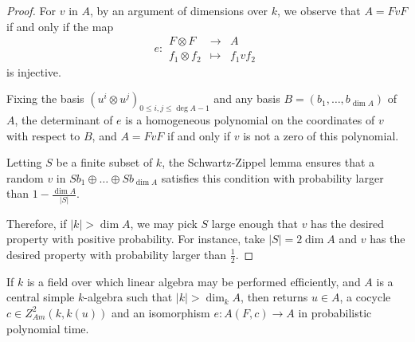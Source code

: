     \begin{proof}
        For \(v\) in \(A\), by an argument of dimensions over \(k\), we observe that \(A = FvF\) if and only if the map
        \[e\colon\begin{array}{ccl} F \otimes F &\to &A \\ f_1 \otimes f_2 &\mapsto &f_1vf_2 \end{array}\]
        is injective.

        Fixing the basis \((u^i \otimes u^j)_{0 \leq i,j \leq \deg A - 1}\) and any basis \(B = (b_1,\hdots,b_{\dim A})\) of \(A\), the determinant of \(e\) is a homogeneous polynomial on the coordinates of \(v\) with respect to \(B\), and \(A = FvF\) if and only if \(v\) is not a zero of this polynomial.

        Letting \(S\) be a finite subset of \(k\), the Schwartz-Zippel lemma ensures that a random \(v\) in \(Sb_1 \oplus \hdots \oplus Sb_{\dim A}\) satisfies this condition with probability larger than \(1 - \frac{\dim A}{|S|}\).

        Therefore, if \(|k| > \dim A\), we may pick \(S\) large enough that \(v\) has the desired property with positive probability. For instance, take \(|S| = 2\dim A\) and \(v\) has the desired property with probability larger than \(\frac{1}{2}\).
    \end{proof}
    
    \begin{theorem}\label{thm:AlgoFindCocycle}
        If \(k\) is a field over which linear algebra may be performed efficiently, and \(A\) is a central simple \(k\)-algebra such that \(|k| > \dim_k A\), then  returns \(u \in A\), a cocycle \(c \in Z_{Am}^2(k,k(u))\) and an isomorphism \(e\colon A(F,c) \to A\) in probabilistic polynomial time.
    \end{theorem}

